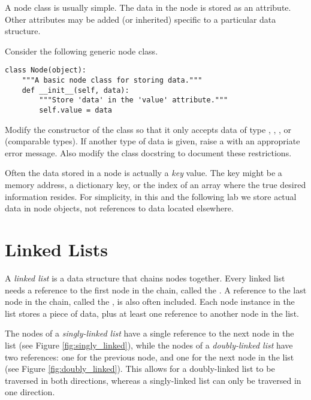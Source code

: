 A node class is usually simple.
The data in the node is stored as an attribute.
Other attributes may be added (or inherited) specific to a particular data structure.

\begin{problem}
Consider the following generic node class.
\begin{lstlisting}
class Node(object):
    """A basic node class for storing data."""
    def __init__(self, data):
        """Store 'data' in the 'value' attribute."""
        self.value = data
\end{lstlisting}
Modify the constructor of the  class so that it only accepts data of type , , , or  (comparable types).
If another type of data is given, raise a  with an appropriate error message.
Also modify the class docstring to document these restrictions.
\end{problem}

\begin{info}
Often the data stored in a node is actually a \emph{key} value.
The key might be a memory address, a dictionary key, or the index of an array where the true desired information resides.
For simplicity, in this and the following lab we store actual data in node objects, not references to data located elsewhere.
\end{info}

\section*{Linked Lists}

A \emph{linked list} is a data structure that chains nodes together.
Every linked list needs a reference to the first node in the chain, called the .
A reference to the last node in the chain, called the , is also often included.
Each node instance in the list stores a piece of data, plus at least one reference to another node in the list.

The nodes of a \emph{singly-linked list} have a single reference to the next node in the list (see Figure \ref{fig:singly_linked}), while the nodes of a \emph{doubly-linked list} have two references: one for the previous node, and one for the next node in the list (see Figure \ref{fig:doubly_linked}).
This allows for a doubly-linked list to be traversed in both directions, whereas a singly-linked list can only be traversed in one direction.


